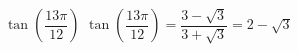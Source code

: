 {$\tan\left(\dfrac{13\pi}{12}\right)$}
{$\tan\left(\dfrac{13\pi}{12}\right) = \dfrac{3-\sqrt{3}}{3+\sqrt{3}} = 2-\sqrt{3}$}
